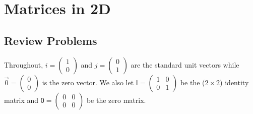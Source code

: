 \section{Matrices in 2D}

\subsection{Review Problems}

Throughout, $\unit{i} = \begin{pmatrix} 1 \\ 0 \end{pmatrix}$ and $\unit{j} = \begin{pmatrix} 0 \\ 1 \end{pmatrix}$ are the standard unit vectors while $\vec{0} = \begin{pmatrix} 0 \\ 0 \end{pmatrix}$ is the zero vector. We also let $\mathsf{I} = \begin{pmatrix} 1 & 0 \\ 0 & 1 \end{pmatrix}$ be the ($2\times 2$) identity matrix and $\mathsf{0} = \begin{pmatrix} 0 & 0 \\ 0 & 0 \end{pmatrix}$ be the zero matrix.

